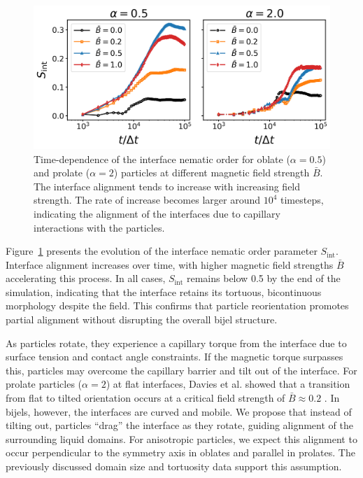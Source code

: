     \begin{figure}
    \includegraphics[width=\columnwidth]{../figures/results/paper1/interface_nematic.png}
    \caption{Time-dependence of the interface nematic order for oblate ($\alpha=0.5$) and prolate ($\alpha=2$) particles at different magnetic field strength $\bar{B}$. The interface alignment tends to increase with increasing field strength. The rate of increase becomes larger around $10^4$ timesteps, indicating the alignment of the interfaces due to capillary interactions with the particles.}
    \label{fig:interface_nematic}
    \end{figure}

Figure~\ref{fig:interface_nematic} presents the evolution of the interface nematic order parameter \(S_{\text{int}}\). Interface alignment increases over 
time, with higher magnetic field strengths \(\bar{B}\) accelerating this process. In all cases, \(S_{\text{int}}\) remains below 0.5 by the end of the 
simulation, indicating that the interface retains its tortuous, bicontinuous morphology despite the field. This confirms that particle reorientation promotes 
partial alignment without disrupting the overall bijel structure.
    
As particles rotate, they experience a capillary torque from the interface due to surface tension and contact angle constraints. If the magnetic torque 
surpasses this, particles may overcome the capillary barrier and tilt out of the interface. For prolate particles (\(\alpha = 2\)) at flat interfaces, 
Davies et al. showed that a transition from flat to tilted orientation occurs at a critical field strength of \(\bar{B} \approx 0.2\) 
\cite{bresme_orientational_2007,davies_interface_2014,newton_influence_2014}. In bijels, however, the interfaces are curved and mobile. We propose that 
instead of tilting out, particles “drag” the interface as they rotate, guiding alignment of the surrounding liquid domains. For anisotropic particles, 
we expect this alignment to occur perpendicular to the symmetry axis in oblates and parallel in prolates. The previously discussed domain size and 
tortuosity data support this assumption.
    
